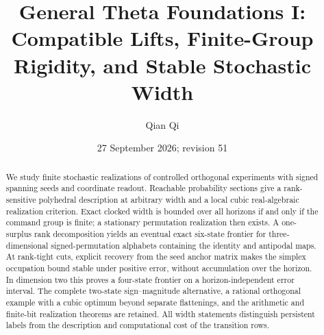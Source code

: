 \documentclass[11pt]{amsart}
\title[Compatible lifts and stochastic width]{General Theta Foundations I: \\
Compatible Lifts, Finite-Group Rigidity, and Stable Stochastic Width}
\author{Qian Qi}
\date{27 September 2026; revision 51}
\numberwithin{equation}{section}
\theoremstyle{definition}\newtheorem{definition}[theorem]{Definition}
\begin{document}
\begin{abstract}
We study finite stochastic realizations of controlled orthogonal experiments
with signed spanning seeds and coordinate readout. Reachable probability
sections give a rank-sensitive polyhedral description at arbitrary width
and a local cubic real-algebraic realization criterion. Exact clocked
width is bounded over all horizons if and only if the command group is
finite; a stationary permutation realization then exists. A one-surplus
rank decomposition yields an eventual exact six-state frontier for
three-dimensional signed-permutation alphabets containing the identity
and antipodal maps. At rank-tight cuts, explicit recovery from the seed
anchor matrix makes the simplex occupation bound stable under positive
error, without accumulation over the horizon. In dimension two this
proves a four-state frontier on a horizon-independent error interval.
The complete two-state sign--magnitude alternative, a rational orthogonal
example with a cubic optimum beyond separate flattenings, and the
arithmetic and finite-bit realization theorems are retained. All width
statements distinguish persistent labels from the description and
computational cost of the transition rows.
\end{abstract}
\maketitle















\appendix











\end{document}
